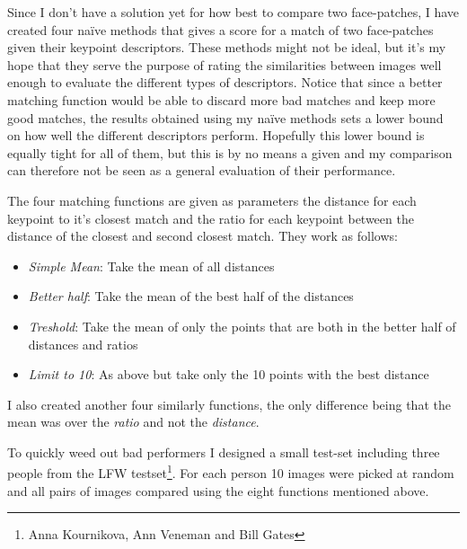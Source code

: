 \documentclass{article}
\begin{document}
Since I don't have a solution yet for how best to compare two face-patches, I 
have created four na\"ive methods that gives a score for a match of two 
face-patches given their keypoint descriptors. These methods might not be 
ideal, but it's my hope that they serve the purpose of rating the similarities 
between images well enough to evaluate the different types of descriptors.  
Notice that since a better matching function would be able to discard more bad 
matches and keep more good matches, the results obtained using my na\"ive 
methods sets a lower bound on how well the different descriptors perform.  
Hopefully this lower bound is equally tight for all of them, but this is by no 
means a given and my comparison can therefore not be seen as a general 
evaluation of their performance.

The four matching functions are given as parameters the distance for each 
keypoint to it's closest match and the ratio for each keypoint between the 
distance of the closest and second closest match. They work as follows:
\begin{itemize}
	\item{\emph{Simple Mean}: Take the mean of all distances}
	\item{\emph{Better half}: Take the mean of the best half of the distances}
	\item{\emph{Treshold}: Take the mean of only the points that are both in the 
	better half of distances and ratios}
	\item{\emph{Limit to 10}: As above but take only the 10 points with the 
best distance}
\end{itemize}
I also created another four similarly functions, the only difference being that 
the mean was over the \emph{ratio} and not the \emph{distance}.

To quickly weed out bad performers I designed a small test-set including three 
people from the LFW testset\footnote{Anna Kournikova, Ann Veneman and Bill 
Gates}. For each person 10 images were picked at random and all pairs of images 
compared using the eight functions mentioned above.
\end{document}
